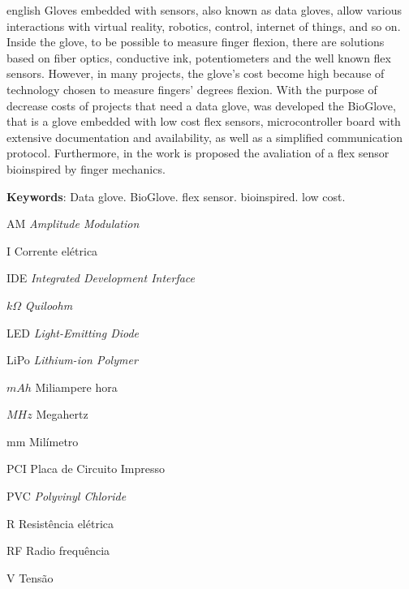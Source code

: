 \documentclass[
	12pt,				%
	openright,			%
	oneside,			%
	a4paper,			%
	english,			%
	brazil				%
	]{abntex2}
\begin{document}
\begin{resumo}[Abstract]
 \begin{otherlanguage*}{english}
\hspace{1.5cm}Gloves embedded with sensors, also known as data gloves, allow various interactions with virtual reality, robotics, control, internet of things, and so on. Inside the glove, to be possible to measure finger flexion, there are solutions based on fiber optics, conductive ink, potentiometers and the well known flex sensors. However,
in many projects, the glove's cost become high because of technology chosen to measure fingers' degrees flexion. With the purpose of decrease costs of projects that need a data glove, was developed the BioGlove, that is a glove embedded with low cost flex sensors, microcontroller board with extensive documentation and availability, as well as a simplified communication protocol. Furthermore, in the work is proposed the avaliation of a flex sensor bioinspired by finger mechanics.



   \vspace{\onelineskip}
 
   \noindent 
   \textbf{Keywords}: Data glove. BioGlove. flex sensor. bioinspired. low cost.
 \end{otherlanguage*}
\end{resumo}


\listoffigures*
\cleardoublepage

\listoftables*
\cleardoublepage

\begin{siglas}

	\item[AM]\textit{Amplitude Modulation}
	\item[I]Corrente elétrica
	\item[IDE]\textit{Integrated Development Interface}
	\item[$k\Omega$]\textit{Quiloohm}
	\item[LED]\textit{Light-Emitting Diode}
	\item[LiPo]\textit{Lithium-ion Polymer}
	\item[$mAh$]Miliampere hora
	\item[$MHz$]Megahertz
	\item[mm]Milímetro
	\item[PCI]Placa de Circuito Impresso
	\item[PVC]\textit{Polyvinyl Chloride}	
	\item[R]Resistência elétrica
	\item[RF]Radio frequência
	\item[V]Tensão

	
\end{siglas}
\end{document}
